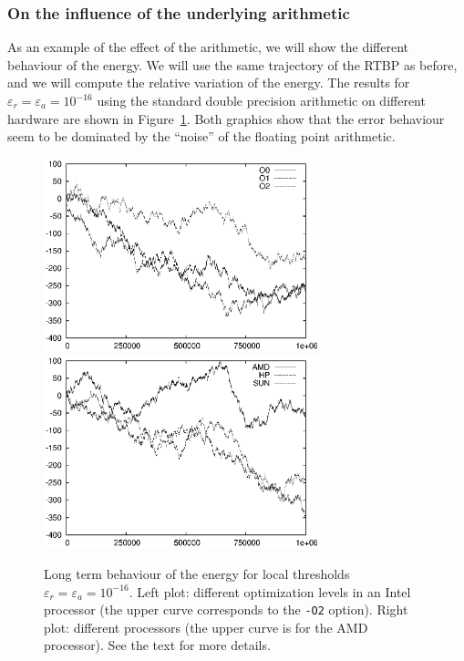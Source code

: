 \documentclass[12pt,twoside]{article}
\begin{document}
\subsubsection{On the influence of the underlying arithmetic}
As an example of the effect of the arithmetic, we will show the
different behaviour of the energy. We will use the same trajectory of
the RTBP as before, and we will compute the relative variation of the
energy. The results for $\varepsilon_r=\varepsilon_a=10^{-16}$ using
the standard double precision arithmetic on different hardware are
shown in Figure~\ref{fig:error-arch}. Both graphics show that the
error behaviour seem to be dominated by the ``noise'' of the floating
point arithmetic.

\begin{figure}
\includegraphics[width=80mm]{eps/intel.eps}\hfill
\includegraphics[width=80mm]{eps/nonintel.eps}
\caption{Long term behaviour of the energy for local thresholds
  $\varepsilon_r=\varepsilon_a=10^{-16}$. Left plot: different
  optimization levels in an Intel processor (the upper curve
  corresponds to the \texttt{-O2} option). Right plot: different
  processors (the upper curve is for the AMD processor). See the text
  for more details.}
\label{fig:error-arch}
\end{figure}
\end{document}
